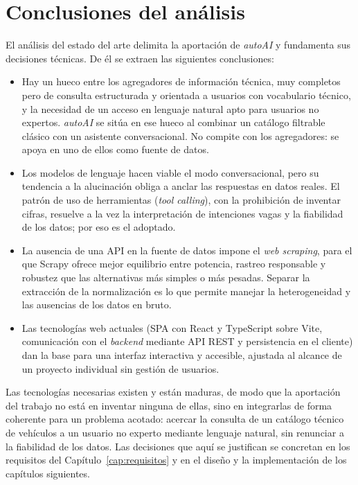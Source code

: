 \section{Conclusiones del análisis}
\label{sec:arte-conclusiones}

El análisis del estado del arte delimita la aportación de \emph{autoAI} y
fundamenta sus decisiones técnicas. De él se extraen las siguientes conclusiones:

\begin{itemize}
  \item Hay un hueco entre los agregadores de información técnica, muy completos
        pero de consulta estructurada y orientada a usuarios con vocabulario
        técnico, y la necesidad de un acceso en lenguaje natural apto para usuarios
        no expertos. \emph{autoAI} se sitúa en ese hueco al combinar un catálogo
        filtrable clásico con un asistente conversacional. No compite con los
        agregadores: se apoya en uno de ellos como fuente de datos.

  \item Los modelos de lenguaje hacen viable el modo conversacional, pero su
        tendencia a la alucinación obliga a anclar las respuestas en datos reales.
        El patrón de uso de herramientas (\emph{tool calling}), con la prohibición
        de inventar cifras, resuelve a la vez la interpretación de intenciones
        vagas y la fiabilidad de los datos; por eso es el adoptado.

  \item La ausencia de una API en la fuente de datos impone el \emph{web
        scraping}, para el que Scrapy ofrece mejor equilibrio entre potencia,
        rastreo responsable y robustez que las alternativas más simples o más
        pesadas. Separar la extracción de la normalización es lo que permite
        manejar la heterogeneidad y las ausencias de los datos en bruto.

  \item Las tecnologías web actuales (SPA con React y TypeScript sobre Vite,
        comunicación con el \emph{backend} mediante API REST y persistencia en el
        cliente) dan la base para una interfaz interactiva y accesible, ajustada al
        alcance de un proyecto individual sin gestión de usuarios.
\end{itemize}

Las tecnologías necesarias existen y están maduras, de modo que la aportación del
trabajo no está en inventar ninguna de ellas, sino en integrarlas de forma
coherente para un problema acotado: acercar la consulta de un catálogo técnico de
vehículos a un usuario no experto mediante lenguaje natural, sin renunciar a la
fiabilidad de los datos. Las decisiones que aquí se justifican se concretan en los
requisitos del Capítulo~\ref{cap:requisitos} y en el diseño y la implementación de
los capítulos siguientes.


